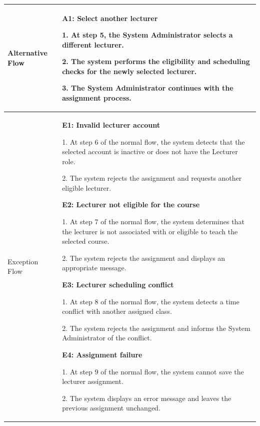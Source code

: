 \begin{longtable}{|>{\bfseries\raggedright\arraybackslash}p{}|>{\raggedright\arraybackslash}p{}|}
Alternative Flow &
\textbf{A1: Select another lecturer} \par
1. At step 5, the System Administrator selects a different lecturer. \par
2. The system performs the eligibility and scheduling checks for the newly selected lecturer. \par
3. The System Administrator continues with the assignment process. \\ \hline
Exception Flow &
\textbf{E1: Invalid lecturer account} \par
1. At step 6 of the normal flow, the system detects that the selected account is inactive or does not have the Lecturer role. \par
2. The system rejects the assignment and requests another eligible lecturer. \par\vspace{4pt}
\textbf{E2: Lecturer not eligible for the course} \par
1. At step 7 of the normal flow, the system determines that the lecturer is not associated with or eligible to teach the selected course. \par
2. The system rejects the assignment and displays an appropriate message. \par\vspace{4pt}
\textbf{E3: Lecturer scheduling conflict} \par
1. At step 8 of the normal flow, the system detects a time conflict with another assigned class. \par
2. The system rejects the assignment and informs the System Administrator of the conflict. \par\vspace{4pt}
\textbf{E4: Assignment failure} \par
1. At step 9 of the normal flow, the system cannot save the lecturer assignment. \par
2. The system displays an error message and leaves the previous assignment unchanged. \\ \hline
\end{longtable}


